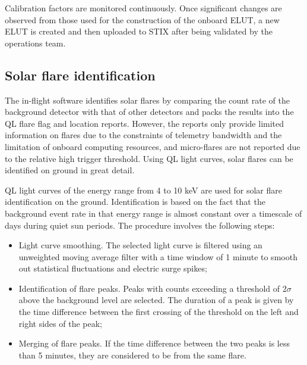 \documentclass[referee]{aa} %
\begin{document}
Calibration factors are monitored continuously. Once significant changes are 
observed from those used for the construction of  the onboard ELUT, 
 a new ELUT is  created and  then uploaded to STIX after being validated by the operations team. 

\subsection{Solar flare identification}
The in-flight software identifies solar flares by comparing  the count rate of 
the background detector with that of other detectors 
 and packs the results into the QL flare flag and location reports.
However,  the reports only provide limited information on flares due to the constraints of telemetry 
bandwidth and the limitation of onboard computing resources, and micro-flares are not 
reported due to the relative high trigger threshold.
Using QL light curves, solar flares can be identified on ground in great detail.

QL light curves of the energy range from  4 to 10 keV are used for solar flare identification
on the ground. Identification is based on the fact 
that the background event rate in that energy range is almost constant 
over a timescale of days during quiet sun periods. 
The procedure involves the following steps:
\begin{itemize}
  \item Light curve smoothing. The selected light curve is filtered using an unweighted
  moving average filter with a time window of 1 minute to smooth out statistical fluctuations and electric surge spikes;
  \item Identification of flare peaks. Peaks with counts exceeding a threshold of $2\sigma$ above the background level
   are selected. The duration of a peak is given by the time difference between the first 
   crossing of the threshold on the left and right sides of the peak;  
  \item Merging of flare peaks. If the time difference between the two peaks is less than 5 minutes,
   they are considered to be from the same flare.
\end{itemize}
\end{document}
